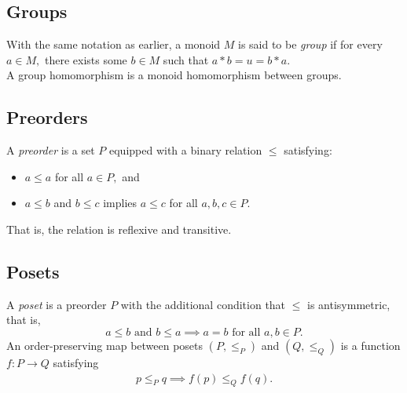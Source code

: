 \subsection{Groups}
With the same notation as earlier, a monoid $M$ is said to be \emph{group} if for every $a \in M,$ there exists some $b \in M$ such that $a * b = u = b * a.$\\
A group homomorphism is a monoid homomorphism between groups.
\subsection{Preorders}
A \emph{preorder} is a set $P$ equipped with a binary relation $\le$ satisfying:
\begin{itemize}
	\item $a \le a$ for all $a \in P,$ and
	\item $a \le b$ and $b \le c$ implies $a \le c$ for all $a, b, c \in P.$
\end{itemize}
That is, the relation is reflexive and transitive.
\subsection{Posets}
A \emph{poset} is a preorder $P$ with the additional condition that $\le$ is antisymmetric, that is,
	\begin{equation*} 
		a \le b \text{ and } b \le a \implies a = b \text{ for all } a, b \in P.
	\end{equation*}
An order-preserving map between posets $(P, \le_P)$ and $(Q, \le_Q)$ is a function $f:P\to Q$ satisfying
\begin{align*} 
	p \le_P q \implies f(p) \le_Q f(q). 
\end{align*}
